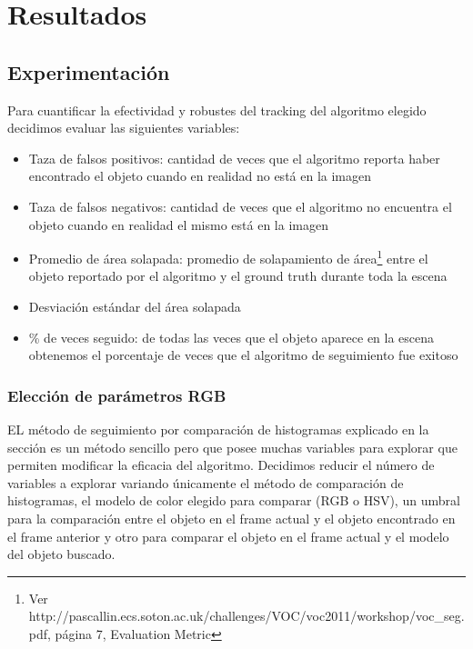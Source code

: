 \chapter{Resultados}

\section{Experimentación}



Para cuantificar la efectividad y robustes del tracking del algoritmo elegido decidimos evaluar las siguientes variables:
\begin{itemize}
	\item Taza de falsos positivos: cantidad de veces que el algoritmo reporta haber encontrado el objeto cuando en realidad no está en la imagen
	\item Taza de falsos negativos: cantidad de veces que el algoritmo no encuentra el objeto cuando en realidad el mismo está en la imagen
	\item Promedio de área solapada: promedio de solapamiento de área\footnote{Ver http://pascallin.ecs.soton.ac.uk/challenges/VOC/voc2011/workshop/voc\_seg.pdf, página 7, Evaluation Metric} entre el objeto reportado por el algoritmo y el ground truth durante toda la escena
	\item Desviación estándar del área solapada
	\item \% de veces seguido: de todas las veces que el objeto aparece en la escena obtenemos el porcentaje de veces que el algoritmo de seguimiento fue exitoso	
\end{itemize}

\subsection{Elección de parámetros RGB}
EL método de seguimiento por comparación de histogramas explicado en la sección  es un método sencillo pero que posee muchas variables para explorar que permiten modificar la eficacia del algoritmo. Decidimos reducir el número de variables a explorar variando únicamente el método de comparación de histogramas, el modelo de color elegido para comparar (RGB o HSV), un umbral para la comparación entre el objeto en el frame actual y el objeto encontrado en el frame anterior y otro para comparar el objeto en el frame actual y el modelo del objeto buscado.

